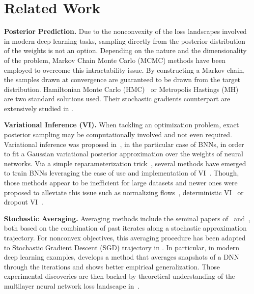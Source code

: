 \documentclass[tablecaption=bottom,wcp]{jmlr} %
\begin{document}
\section{Related Work}\label{sec:related}

\textbf{Posterior Prediction.}
Due to the nonconvexity of the loss landscapes involved in modern deep learning tasks, sampling directly from the posterior distribution of the weights is not an option.
Depending on the nature and the dimensionality of the problem, Markov Chain Monte Carlo (MCMC) methods have been employed to overcome this intractability issue.
By constructing a Markov chain, the samples drawn at convergence are guaranteed to be drawn from the target distribution.
Hamiltonian Monte Carlo (HMC)~\citep{neal2011mcmc} or Metropolis Hastings (MH)~\citep{hastings1970monte} are two standard solutions used.
Their stochastic gradients counterpart are extensively studied in \citep{ma2015complete}.

\vspace{0.08in}
\noindent \textbf{Variational Inference (VI).}
When tackling an optimization problem, exact posterior sampling may be computationally involved and not even required.
Variational inference was proposed in~\citep{graves2011practical}, in the particular case of BNNs, in order to fit a Gaussian variational posterior approximation over the weights of neural networks.
Via a simple reparameterization trick~\citep{blundell2015weight}, several methods have emerged to train BNNs leveraging the ease of use and implementation of VI~\citep{kingma2015variational,blundell2015weight,molchanov2017variational}.
Though, those methods appear to be inefficient for large datasets and newer ones were proposed to alleviate this issue such as normalizing flows~\citep{louizos2017multiplicative}, deterministic VI~\citep{wu2018deterministic} or dropout VI~\citep{gal2016dropout}.

\vspace{0.08in}
\noindent \textbf{Stochastic Averaging.}
Averaging methods include the seminal papers of~\citep{polyak1990sa} and~\citep{ruppert1988efficient}, both based on the combination of past iterates along a stochastic approximation trajectory.
For nonconvex objectives, this averaging procedure has been adapted to Stochastic Gradient Descent (SGD) trajectory in \citep{zhou2017convergence}.
In particular, in modern deep learning examples, \citet{izmailov2018averaging} develops a method that averages snapshots of a DNN through the iterations and shows better empirical generalization.
Those experimental discoveries are then backed by theoretical understanding of the multilayer neural network loss landscape in~\citep{keskar2016large,he2019asymmetric}.
\end{document}
